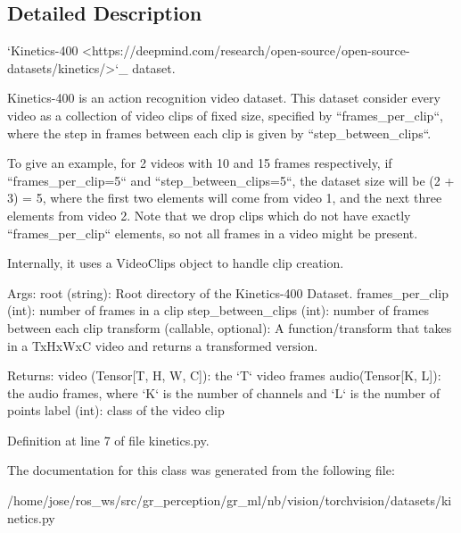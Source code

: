 \subsection{Detailed Description}
\begin{DoxyVerb}`Kinetics-400 <https://deepmind.com/research/open-source/open-source-datasets/kinetics/>`_
dataset.

Kinetics-400 is an action recognition video dataset.
This dataset consider every video as a collection of video clips of fixed size, specified
by ``frames_per_clip``, where the step in frames between each clip is given by
``step_between_clips``.

To give an example, for 2 videos with 10 and 15 frames respectively, if ``frames_per_clip=5``
and ``step_between_clips=5``, the dataset size will be (2 + 3) = 5, where the first two
elements will come from video 1, and the next three elements from video 2.
Note that we drop clips which do not have exactly ``frames_per_clip`` elements, so not all
frames in a video might be present.

Internally, it uses a VideoClips object to handle clip creation.

Args:
    root (string): Root directory of the Kinetics-400 Dataset.
    frames_per_clip (int): number of frames in a clip
    step_between_clips (int): number of frames between each clip
    transform (callable, optional): A function/transform that  takes in a TxHxWxC video
        and returns a transformed version.

Returns:
    video (Tensor[T, H, W, C]): the `T` video frames
    audio(Tensor[K, L]): the audio frames, where `K` is the number of channels
        and `L` is the number of points
    label (int): class of the video clip
\end{DoxyVerb}
 

Definition at line 7 of file kinetics.\+py.



The documentation for this class was generated from the following file\+:\begin{DoxyCompactItemize}
\item 
/home/jose/ros\+\_\+ws/src/gr\+\_\+perception/gr\+\_\+ml/nb/vision/torchvision/datasets/kinetics.\+py\end{DoxyCompactItemize}
